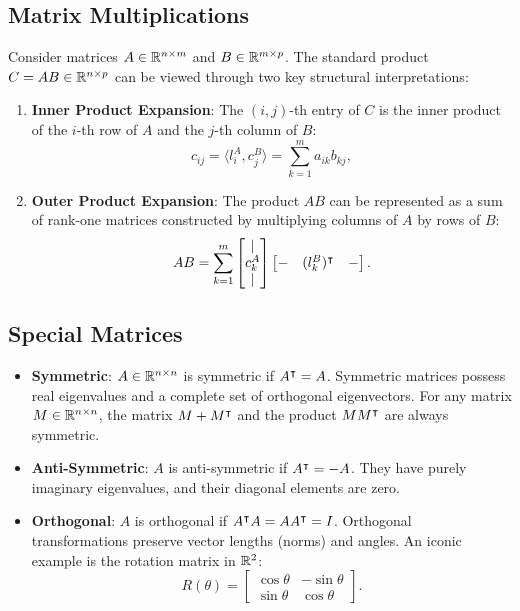 \subsection{Matrix Multiplications}
Consider matrices $A \in \mathbb{R}^{n \times m}$ and $B \in \mathbb{R}^{m \times p}$. The standard product $C = AB \in \mathbb{R}^{n \times p}$ can be viewed through two key structural interpretations:
\begin{enumerate}
    \item \textbf{Inner Product Expansion}: The $(i, j)$-th entry of $C$ is the inner product of the $i$-th row of $A$ and the $j$-th column of $B$:
    \begin{equation}
c_{ij} = \langle l_i^A, c_j^B \rangle = \sum_{k=1}^m a_{ik} b_{kj} ,
    \end{equation}
    \item \textbf{Outer Product Expansion}: The product $AB$ can be represented as a sum of rank-one matrices constructed by multiplying columns of $A$ by rows of $B$:
    \begin{equation}
AB = \sum_{k=1}^m \begin{bmatrix} | \\ c_k^A \\ | \end{bmatrix} \begin{bmatrix} - & (l_k^B)^\intercal & - \end{bmatrix} .
    \end{equation}
\end{enumerate}

\subsection{Special Matrices}
\begin{itemize}
    \item \textbf{Symmetric}: $A \in \mathbb{R}^{n \times n}$ is symmetric if $A^\intercal = A$. Symmetric matrices possess real eigenvalues and a complete set of orthogonal eigenvectors. For any matrix $M \in \mathbb{R}^{n \times n}$, the matrix $M + M^\intercal$ and the product $M M^\intercal$ are always symmetric.
    \item \textbf{Anti-Symmetric}: $A$ is anti-symmetric if $A^\intercal = -A$. They have purely imaginary eigenvalues, and their diagonal elements are zero.
    \item \textbf{Orthogonal}: $A$ is orthogonal if $A^\intercal A = A A^\intercal = I$. Orthogonal transformations preserve vector lengths (norms) and angles. An iconic example is the rotation matrix in $\mathbb{R}^2$:
    \begin{equation}
R(\theta) = \begin{bmatrix} \cos\theta & -\sin\theta \\ \sin\theta & \cos\theta \end{bmatrix} .
    \end{equation}
\end{itemize}

